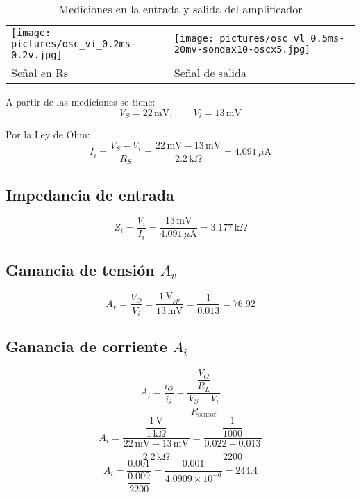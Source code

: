     \begin{table}[h]
    \centering
    \begin{tabularx}{\textwidth}{@{}X X@{}}
    \texttt{[image: pictures/osc\_vi\_0.2ms-0.2v.jpg]} &
    \texttt{[image: pictures/osc\_vl\_0.5ms-20mv-sondax10-oscx5.jpg]} \\
    \centering\small Señal en Rs & \centering\small Señal de salida
  \end{tabularx}
    \caption{Mediciones en la entrada y salida del amplificador}
    \end{table}

    \vspace{0.5cm}
    A partir de las mediciones se tiene:
    \[
    V_S = 22\,\text{mV}, \qquad V_i = 13\,\text{mV}
    \]

    Por la Ley de Ohm:
    \[
    I_i = \frac{V_S - V_i}{R_S}
         = \frac{22\,\text{mV} - 13\,\text{mV}}{2.2\,\text{k}\Omega}
         = 4.091\,\mu\text{A}
    \]

    
    \noindent
    \begin{minipage}[t]{0.48\linewidth}
        \subsection*{Impedancia de entrada}
        \[
        Z_i = \frac{V_i}{I_i}
             = \frac{13\,\text{mV}}{4.091\,\mu\text{A}}
             = \boxed{3.177\,\text{k}\Omega}
        \]
    
        \subsection*{Ganancia de tensión $A_v$}
        \[
        A_v=\frac{V_O}{V_i}
             =\frac{1\,\text{V}_{pp}}{13\,\text{mV}}
             =\frac{1}{0.013}
             =\boxed{76.92}
        \]
    \end{minipage}\hfill
    \begin{minipage}[t]{0.48\linewidth}
        \subsection*{Ganancia de corriente $A_i$}
        \[
        A_i=\frac{i_O}{i_i}
            =\frac{\dfrac{V_O}{R_L}}{\dfrac{V_S - V_i}{R_{\text{sensor}}}}
        \]
        \[
        A_i=\frac{\dfrac{1\,\text{V}}{1\,\text{k}\Omega}}{\dfrac{22\,\text{mV}-13\,\text{mV}}{2.2\,\text{k}\Omega}}
            =\frac{\dfrac{1}{1000}}{\dfrac{0.022-0.013}{2200}}
        \]
        \[
        A_i=\frac{0.001}{\dfrac{0.009}{2200}}
            =\frac{0.001}{4.0909\times10^{-6}}
            =\boxed{244.4}
        \]
    \end{minipage}
    \vspace{0.5cm}

